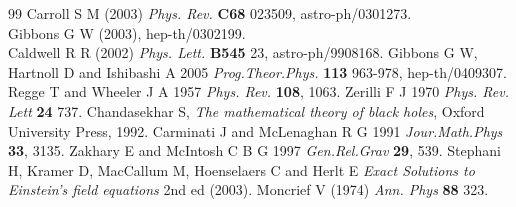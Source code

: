 \documentclass[12pt,aps,floats,showpacs,amssymb,tightenlines]{revtex4}
\begin{document}
\begin{thebibliography}{99}
 Carroll S M (2003) {\em Phys. Rev.} {\bf C68} 023509,
astro-ph/0301273.\\
Gibbons  G W (2003), hep-th/0302199.\\
Caldwell R R (2002) {\em Phys. Lett.} {\bf B545} 23,
astro-ph/9908168.
 Gibbons G W, Hartnoll D and  Ishibashi A 2005 {\em Prog.Theor.Phys.}
{\bf 113} 963-978, hep-th/0409307.
 Regge T and  Wheeler J A 1957 {\it Phys. Rev.} {\bf 108}, 1063.
  Zerilli F J 1970 {\it
Phys. Rev. Lett} {\bf 24} 737.
 Chandasekhar S, {\em The mathematical theory of
black holes}, Oxford University Press, 1992.
 Carminati J  and McLenaghan R G 1991  {\it Jour.Math.Phys} {\bf 33},
3135.
 Zakhary E and  McIntosh C B G 1997 {\em Gen.Rel.Grav} {\bf 29}, 539.
 Stephani H, Kramer D, MacCallum M, Hoenselaers C and Herlt E {\em
Exact Solutions to Einstein's field equations} 2nd ed (2003).
 Moncrief V (1974) {\em Ann. Phys} {\bf 88} 323.
\end{thebibliography}
\end{document}
